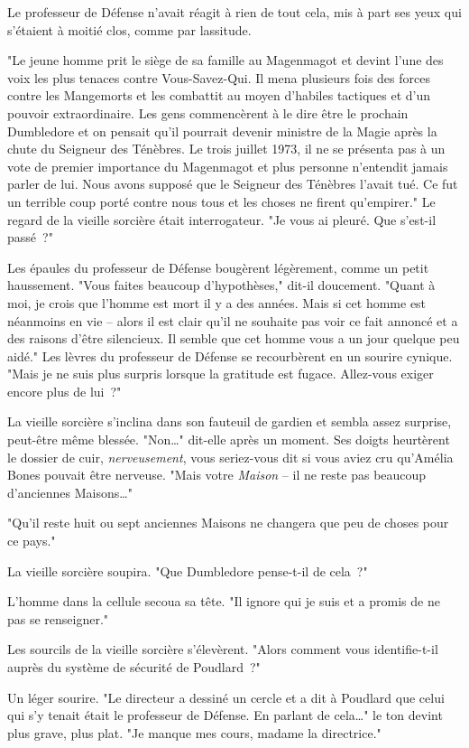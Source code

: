 Le professeur de Défense n'avait réagit à rien de tout cela, mis à part ses yeux qui s'étaient à moitié clos, comme par lassitude.

"Le jeune homme prit le siège de sa famille au Magenmagot et devint l'une des voix les plus tenaces contre Vous-Savez-Qui. Il mena plusieurs fois des forces contre les Mangemorts et les combattit au moyen d'habiles tactiques et d'un pouvoir extraordinaire. Les gens commencèrent à le dire être le prochain Dumbledore et on pensait qu'il pourrait devenir ministre de la Magie après la chute du Seigneur des Ténèbres. Le trois juillet 1973, il ne se présenta pas à un vote de premier importance du Magenmagot et plus personne n'entendit jamais parler de lui. Nous avons supposé que le Seigneur des Ténèbres l'avait tué. Ce fut un terrible coup porté contre nous tous et les choses ne firent qu'empirer." Le regard de la vieille sorcière était interrogateur. "Je vous ai pleuré. Que s'est-il passé~?"

Les épaules du professeur de Défense bougèrent légèrement, comme un petit haussement. "Vous faites beaucoup d'hypothèses," dit-il doucement. "Quant à moi, je crois que l'homme est mort il y a des années. Mais si cet homme est néanmoins en vie -- alors il est clair qu'il ne souhaite pas voir ce fait annoncé et a des raisons d'être silencieux. Il semble que cet homme vous a un jour quelque peu aidé." Les lèvres du professeur de Défense se recourbèrent en un sourire cynique. "Mais je ne suis plus surpris lorsque la gratitude est fugace. Allez-vous exiger encore plus de lui~?"

La vieille sorcière s'inclina dans son fauteuil de gardien et sembla assez surprise, peut-être même blessée. "Non…" dit-elle après un moment. Ses doigts heurtèrent le dossier de cuir, \emph{nerveusement}, vous seriez-vous dit si vous aviez cru qu'Amélia Bones pouvait être nerveuse. "Mais votre \emph{Maison} -- il ne reste pas beaucoup d'anciennes Maisons…"

"Qu'il reste huit ou sept anciennes Maisons ne changera que peu de choses pour ce pays."

La vieille sorcière soupira. "Que Dumbledore pense-t-il de cela~?"

L'homme dans la cellule secoua sa tête. "Il ignore qui je suis et a promis de ne pas se renseigner."

Les sourcils de la vieille sorcière s'élevèrent. "Alors comment vous identifie-t-il auprès du système de sécurité de Poudlard~?"

Un léger sourire. "Le directeur a dessiné un cercle et a dit à Poudlard que celui qui s'y tenait était le professeur de Défense. En parlant de cela…" le ton devint plus grave, plus plat. "Je manque mes cours, madame la directrice."

